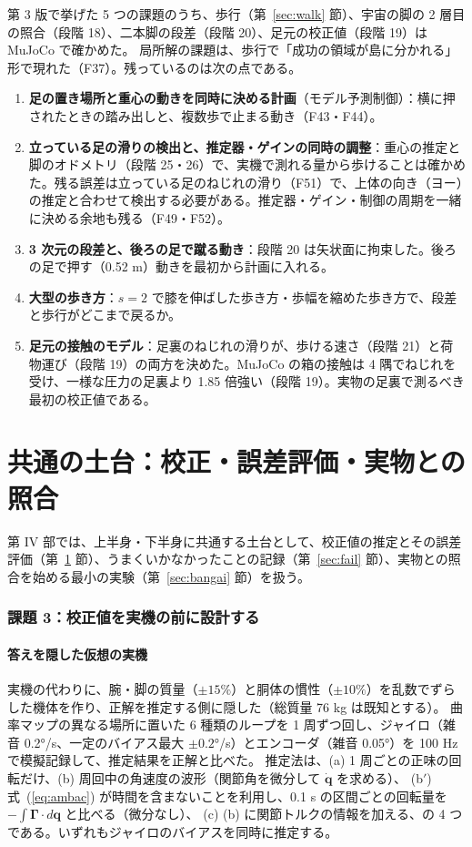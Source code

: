 \documentclass[paper=a4paper,fontsize=10pt,twocolumn,column_gap=2zw,line_length=24zw,number_of_lines=46,head_space=20mm]{jlreq}
\begin{document}
第 3 版で挙げた 5 つの課題のうち、歩行（第~\ref{sec:walk} 節）、宇宙の脚の 2 層目の照合（段階 18）、二本脚の段差（段階 20）、足元の校正値（段階 19）は MuJoCo で確かめた。
局所解の課題は、歩行で「成功の領域が島に分かれる」形で現れた（F37）。残っているのは次の点である。
\begin{enumerate}\setlength{\itemsep}{0pt}
\item \textbf{足の置き場所と重心の動きを同時に決める計画}（モデル予測制御）：横に押されたときの踏み出しと、複数歩で止まる動き（F43・F44）。
\item \textbf{立っている足の滑りの検出と、推定器・ゲインの同時の調整}：重心の推定と脚のオドメトリ（段階 25・26）で、実機で測れる量から歩けることは確かめた。残る誤差は立っている足のねじれの滑り（F51）で、上体の向き（ヨー）の推定と合わせて検出する必要がある。推定器・ゲイン・制御の周期を一緒に決める余地も残る（F49・F52）。
\item \textbf{3 次元の段差と、後ろの足で蹴る動き}：段階 20 は矢状面に拘束した。後ろの足で押す（0.52 m）動きを最初から計画に入れる。
\item \textbf{大型の歩き方}：$s=2$ で膝を伸ばした歩き方・歩幅を縮めた歩き方で、段差と歩行がどこまで戻るか。
\item \textbf{足元の接触のモデル}：足裏のねじれの滑りが、歩ける速さ（段階 21）と荷物運び（段階 19）の両方を決めた。MuJoCo の箱の接触は 4 隅でねじれを受け、一様な圧力の足裏より 1.85 倍強い（段階 19）。実物の足裏で測るべき最初の校正値である。
\end{enumerate}

\part{共通の土台：校正・誤差評価・実物との照合}

第 IV 部では、上半身・下半身に共通する土台として、校正値の推定とその誤差評価（第~\ref{sec:calib} 節）、うまくいかなかったことの記録（第~\ref{sec:fail} 節）、実物との照合を始める最小の実験（第~\ref{sec:bangai} 節）を扱う。

\section{課題 3：校正値を実機の前に設計する}\label{sec:calib}

\subsection{答えを隠した仮想の実機}
実機の代わりに、腕・脚の質量（$\pm15\%$）と胴体の慣性（$\pm10\%$）を乱数でずらした機体を作り、正解を推定する側に隠した（総質量 76 kg は既知とする）。
曲率マップの異なる場所に置いた 6 種類のループを 1 周ずつ回し、ジャイロ（雑音 0.2°/s、一定のバイアス最大 $\pm0.2$°/s）とエンコーダ（雑音 0.05°）を 100 Hz で模擬記録して、推定結果を正解と比べた。
推定法は、(a) 1 周ごとの正味の回転だけ、(b) 周回中の角速度の波形（関節角を微分して $\dot{\bm q}$ を求める）、
(b$'$) 式~(\ref{eq:ambac}) が時間を含まないことを利用し、0.1 s の区間ごとの回転量を $-\int\bm\Gamma\cdot d\bm q$ と比べる（微分なし）、
(c) (b) に関節トルクの情報を加える、の 4 つである。いずれもジャイロのバイアスを同時に推定する。
\end{document}
